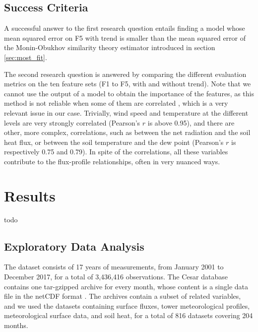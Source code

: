 \documentclass[a4paper]{book}
\begin{document}
\section{Success Criteria}
\label{sec:success}
A successful answer to the first research question entails finding a model whose mean squared error on F5 with trend is smaller than the mean squared error of the Monin-Obukhov similarity theory estimator introduced in section \ref{sec:most_fit}.

The second research question is answered by comparing the different evaluation metrics on the ten feature sets (F1 to F5, with and without trend). Note that we cannot use the output of a model to obtain the importance of the features, as this method is not reliable when some of them are correlated \citep{rf_bias,rf_corr_imp}, which is a very relevant issue in our case. Trivially, wind speed and temperature at the different levels are very strongly correlated (Pearson's $r$ is above 0.95), and there are other, more complex, correlations, such as between the net radiation and the soil heat flux, or between the soil temperature and the dew point (Pearson's $r$ is respectively 0.75 and 0.79). In spite of the correlations, all these variables contribute to the flux-profile relationships, often in very nuanced ways.



\chapter{Results}
\label{ch:results}
todo

\section{Exploratory Data Analysis}
The dataset consists of 17 years of measurements, from January 2001 to December 2017, for a total of 3,436,416 observations. The Cesar database contains one tar-gzipped archive for every month, whose content is a single data file in the netCDF format \citep{netcdf}. The archives contain a subset of related variables, and we used the datasets containing surface fluxes, tower meteorological profiles, meteorological surface  data, and soil heat, for a total of 816 datasets covering 204 months.
\end{document}
